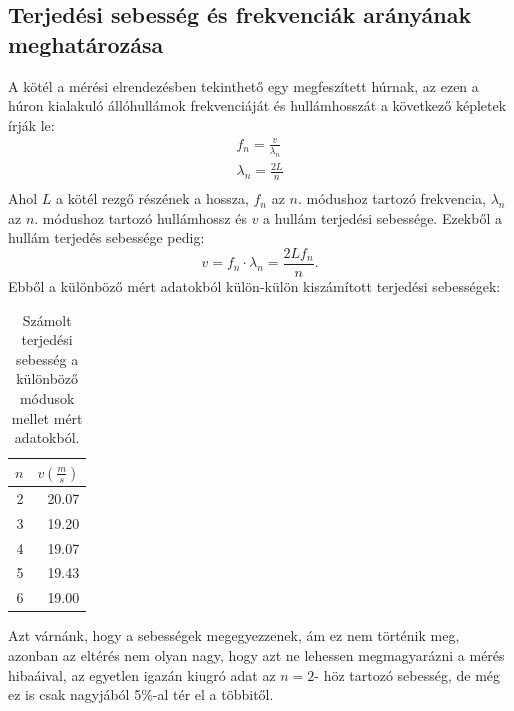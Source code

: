 \documentclass[10pt,pdftex]{report}
\begin{document}
\subsection*{Terjedési sebesség és frekvenciák arányának meghatározása}
A kötél a mérési elrendezésben tekinthető egy megfeszített húrnak, az ezen a húron kialakuló állóhullámok frekvenciáját és hullámhosszát a következő képletek írják le:
\begin{eqnarray*}
    f_n=\frac{v}{\lambda_{n}} \\
    \lambda_{n}=\frac{2L}{n} \\
\end{eqnarray*}
Ahol $L$ a kötél rezgő részének a hossza, $f_n$ az $n.$ módushoz tartozó frekvencia, $\lambda_n$ az $n.$ módushoz tartozó hullámhossz és $v$ a hullám terjedési sebessége. Ezekből a hullám terjedés sebessége pedig:
\begin{equation*}
    v=f_n\cdot\lambda_n=\frac{2Lf_n}{n}. 
\end{equation*}
Ebből a különböző mért adatokból külön-külön kiszámított terjedési sebességek:
\begin{table}[H]
    \centering
    \begin{tabular}{|r|r|}
        \hline
        $n$ & $v\left(\frac{m}{s}\right)$ \\
        \hline
        2 & 20.07 \\
        \hline
        3 & 19.20 \\
        \hline
        4 & 19.07 \\
        \hline
        5 & 19.43 \\
        \hline
        6 & 19.00 \\
        \hline
    \end{tabular}
    \caption{Számolt terjedési sebesség a különböző módusok mellet mért adatokból.}
\end{table}
Azt várnánk, hogy a sebességek megegyezzenek, ám ez nem történik meg, azonban az eltérés nem olyan nagy, hogy azt ne lehessen megmagyarázni a mérés hibaáival, az egyetlen igazán kiugró adat az $n=2$- höz tartozó sebesség, de még ez is csak nagyjából 5\%-al tér el a többitől.\newline 
\end{document}
